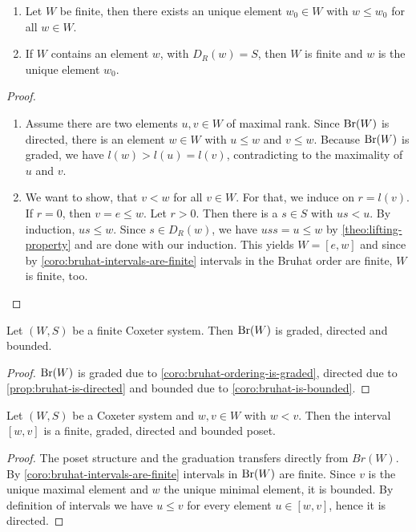 \begin{coro}
	\begin{enumerate}
		\item Let $W$ be finite, then there exists an unique element $w_0 \in W$ with $w \leq w_0$ for all $w \in W$.
		\item If $W$ contains an element $w$, with $D_R(w) = S$, then $W$ is finite and $w$ is the unique element $w_0$.
	\end{enumerate}

	\begin{proof}
		\begin{enumerate}
			\item Assume there are two elements $u,v \in W $ of maximal rank. Since $\operatorname{Br}(W)$ is directed, there is an element $w \in W$ with $u \leq w$ and $v \leq w$. Because $\operatorname{Br}(W)$ is graded, we have $l(w) > l(u) = l(v)$, contradicting to the maximality of $u$ and $v$.
			\item We want to show, that $v < w$ for all $v \in W$. For that, we induce on $r = l(v)$. If $r = 0$, then $v = e \leq w$. Let $r > 0$. Then there is a $s \in S$ with $us < u$. By induction, $us \leq w$. Since $s \in D_R(w)$, we have $uss = u \leq w$ by \ref{theo:lifting-property} and are done with our induction. This yields $W = [e,w]$ and since by \ref{coro:bruhat-intervals-are-finite} intervals in the Bruhat order are finite, $W$ is finite, too. \qedhere
		\end{enumerate}
	\end{proof}
\end{coro}

\begin{coro}
	Let $(W,S)$ be a finite Coxeter system. Then $\operatorname{Br}(W)$ is graded, directed and bounded.

	\begin{proof}
		$\operatorname{Br}(W)$ is graded due to \ref{coro:bruhat-ordering-is-graded}, directed due to \ref{prop:bruhat-is-directed} and bounded due to \ref{coro:bruhat-is-bounded}.
	\end{proof}
\end{coro}

\begin{coro}
	Let $(W,S)$ be a Coxeter system and $w,v \in W$ with $w < v$. Then the interval $[w,v]$ is a finite, graded, directed and bounded poset.

	\begin{proof}
		The poset structure and the graduation transfers directly from $Br(W)$. By \ref{coro:bruhat-intervals-are-finite} intervals in $\operatorname{Br}(W)$ are finite. Since $v$ is the unique maximal element and $w$ the unique minimal element, it is bounded. By definition of intervals we have $u \leq v$ for every element $u \in [w,v]$, hence it is directed.
	\end{proof}
\end{coro}